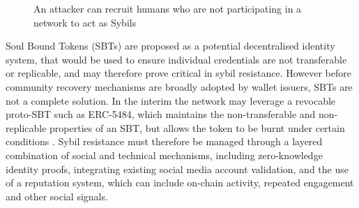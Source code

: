 \documentclass[11pt,a4paper]{article}
\begin{document}
\begin{figure}[H]
    \centering
    \caption{An attacker can recruit humans who are not participating in a network to act as Sybils}
    \label{fig:sybil-attack}
\end{figure}
\vspace{0.1cm}

Soul Bound Tokens (SBTs) are proposed as a potential decentralised identity system, that would be used to ensure individual credentials are not transferable or replicable, and may therefore prove critical in sybil resistance.
However before community recovery mechanisms are broadly adopted by wallet issuers, SBTs are not a complete solution.
In the interim the network may leverage a revocable proto-SBT such as ERC-5484, which maintains the non-transferable and non-replicable properties of an SBT, but allows the token to be burnt under certain conditions \cite{erc5484}.
Sybil resistance must therefore be managed through a layered combination of social and technical mechanisms, including zero-knowledge identity proofs, integrating existing social media account validation, and the use of a reputation system, which can include on-chain activity, repeated engagement and other social signals.
\end{document}
